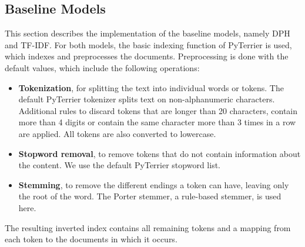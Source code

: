 \subsection{Baseline Models}
This section describes the implementation of the baseline models, namely DPH and TF-IDF.
For both models, the basic indexing function of PyTerrier is used, which indexes and preprocesses the documents.
Preprocessing is done with the default values, which include the following operations:
\begin{itemize}
    \item{\textbf{Tokenization}, for splitting the text into individual words or tokens. The default PyTerrier tokenizer splits text on non-alphanumeric characters. Additional rules to discard tokens that are longer than 20 characters, contain more than 4 digits or contain the same character more than 3 times in a row are applied. All tokens are also converted to lowercase.}
    \item \textbf{Stopword removal}, to remove tokens that do not contain information about the content. We use the default PyTerrier stopword list.
    \item \textbf{Stemming}, to remove the different endings a token can have, leaving only the root of the word. The Porter stemmer, a rule-based stemmer, is used here.
\end{itemize}
The resulting inverted index contains all remaining tokens and a mapping from each token to the documents in which it occurs.

